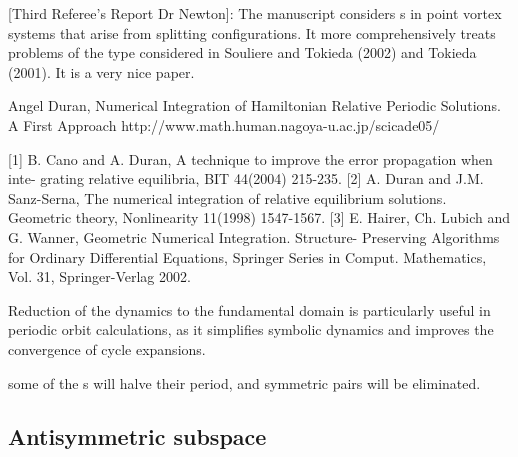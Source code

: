 [Third Referee's Report Dr Newton]:
The manuscript considers {\rpo s} in point vortex systems
that arise from splitting {\reqv} configurations. It more
comprehensively treats problems of the type considered in Souliere and
Tokieda (2002) and Tokieda (2001). It is a very nice paper.

Angel Duran,
Numerical Integration of Hamiltonian
Relative Periodic Solutions. A First Approach
http://www.math.human.nagoya-u.ac.jp/scicade05/

    [1] B. Cano and A. Duran, A technique to improve the error propagation when inte-
grating relative equilibria, BIT 44(2004) 215-235.
    [2] A. Duran and J.M. Sanz-Serna, The numerical integration of relative equilibrium
solutions. Geometric theory, Nonlinearity 11(1998) 1547-1567.
    [3] E. Hairer, Ch. Lubich and G. Wanner, Geometric Numerical Integration. Structure-
Preserving Algorithms for Ordinary Differential Equations, Springer Series in Comput.
Mathematics, Vol. 31, Springer-Verlag 2002.


\bigskip

Reduction of the dynamics to the fundamental domain is particularly
useful in periodic orbit calculations, as it simplifies symbolic dynamics
and improves the convergence of cycle expansions\cite{CvitaEckardt}.

some of the \po s will
halve their period, and symmetric pairs will be eliminated.

\subsection*{Antisymmetric subspace}

